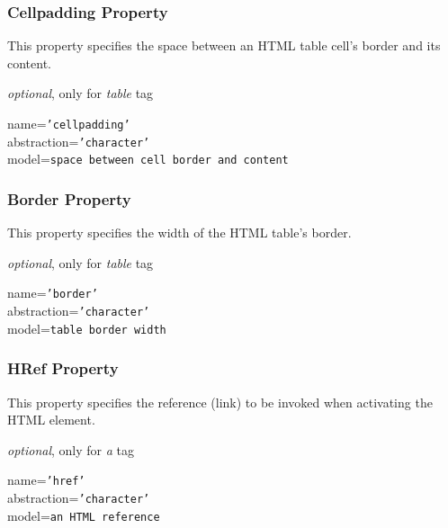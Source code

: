 \subsubsection{Cellpadding Property}

This property specifies the space between an HTML table cell's border and its
content.

\emph{optional}, only for \emph{table} tag

name=\texttt{'cellpadding'}\\
abstraction=\texttt{'character'}\\
model=\texttt{space between cell border and content}

\subsubsection{Border Property}

This property specifies the width of the HTML table's border.

\emph{optional}, only for \emph{table} tag

name=\texttt{'border'}\\
abstraction=\texttt{'character'}\\
model=\texttt{table border width}

\subsubsection{HRef Property}

This property specifies the reference (link) to be invoked when activating the
HTML element.

\emph{optional}, only for \emph{a} tag

name=\texttt{'href'}\\
abstraction=\texttt{'character'}\\
model=\texttt{an HTML reference}
